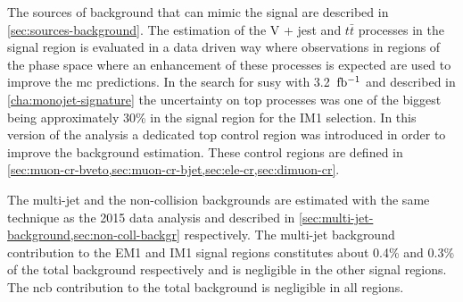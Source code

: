 The sources of background that can mimic the signal are described in
\cref{sec:sources-background}. The estimation of the V + jest and $t \bar{t}$
processes in the signal region is evaluated in a data driven way where
observations in regions of the phase space where an enhancement of these
processes is expected are used to improve the \gls{mc} predictions. In the
search for \gls{susy} with 3.2~$\mbox{fb$^{-1}$}$ and described in
\cref{cha:monojet-signature} the uncertainty on top processes was one of the
biggest being approximately 30\% in the signal region for the IM1 selection. In
this version of the analysis a dedicated top control region was introduced in
order to improve the background estimation. These control regions are defined in
\cref{sec:muon-cr-bveto,sec:muon-cr-bjet,sec:ele-cr,sec:dimuon-cr}.

The multi-jet and the non-collision backgrounds are estimated with the same
technique as the 2015 data analysis and described in
\cref{sec:multi-jet-background,sec:non-coll-backgr} respectively. The multi-jet
background contribution to the EM1 and IM1 signal regions constitutes about
0.4\% and 0.3\% of the total background respectively and is negligible in the
other signal regions. The \gls{ncb} contribution to the total background is
negligible in all regions.
